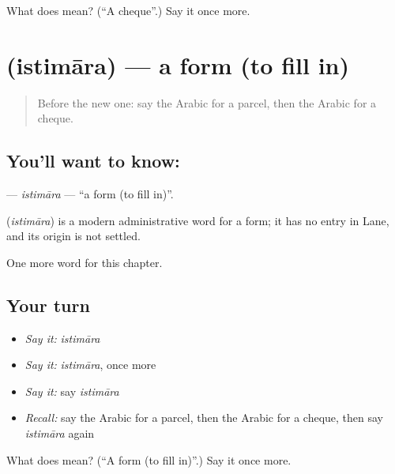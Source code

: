 \begin{tcolorbox}[breakable,colback=teal!4,colframe=teal!35!black,title={Before you move on}]
What does  mean? (\textquotedblleft{}A cheque\textquotedblright{}.) Say it once more.
\end{tcolorbox}
\section[\texorpdfstring{\ar{استمارة} (istimāra)}{استمارة (istimāra)}]{ (istimāra) — a form (to fill in)}

\label{lesson:AR-C183-istimara}



\begin{quote}
Before the new one: say the Arabic for a parcel, then the Arabic for a cheque.
\end{quote}

\subsection*{You'll want to know: }
\textbf{} — \emph{istimāra} — \textquotedblleft{}a form (to fill in)\textquotedblright{}.

\begin{cousinweb}
\textbf{} (\emph{istimāra}) is a modern administrative word for a form; it has no entry in Lane, and its origin is not settled.
\end{cousinweb}

\begin{grammarlens}[title={What you've built}]
One more word for this chapter.
\end{grammarlens}

\subsection*{Your turn}
\begin{itemize}
\raggedright
  \item \emph{Say it:} \emph{istimāra}
  \item \emph{Say it:} \emph{istimāra}, once more
  \item \emph{Say it:} say \emph{istimāra}
  \item \emph{Recall:} say the Arabic for a parcel, then the Arabic for a cheque, then say \emph{istimāra} again
\end{itemize}

\begin{tcolorbox}[breakable,colback=teal!4,colframe=teal!35!black,title={Before you move on}]
What does  mean? (\textquotedblleft{}A form (to fill in)\textquotedblright{}.) Say it once more.
\end{tcolorbox}
